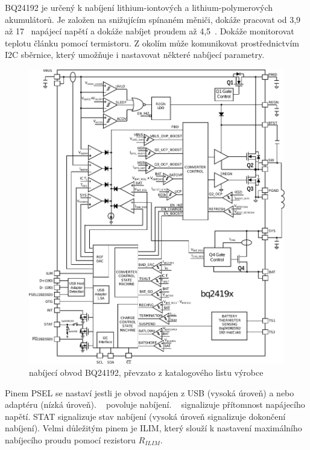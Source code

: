 BQ24192 je určený k nabíjení lithium-iontových a lithium-polymerových akumulátorů. Je založen na snižujícím spínaném měniči, dokáže pracovat od 3,9~ až 17~ napájecí napětí a dokáže nabíjet proudem až 4,5~. Dokáže monitorovat teplotu článku pomocí termistoru. Z okolím může komunikovat prostřednictvím I2C sběrnice, který umožňuje i nastavovat některé nabíjecí parametry.

\begin{figure}[H]
    \begin{center}
        \includegraphics[width=\textwidth]{img/bq24192-block}
    \end{center}
    \caption{nabíjecí obvod BQ24192, převzato z katalogového listu výrobce}
\end{figure}

Pinem PSEL se nastaví jestli je obvod napájen z USB (vysoká úroveň) a nebo adaptéru (nízká úroveň). ~ povoluje nabíjení. ~ signalizuje přítomnost napájecího napětí. STAT signalizuje stav nabíjení (vysoká úroveň signalizuje dokončení nabíjení). Velmi důležitým pinem je ILIM, který slouží k nastavení maximálního nabíjecího proudu pomocí rezistoru $R_{ILIM}$.

